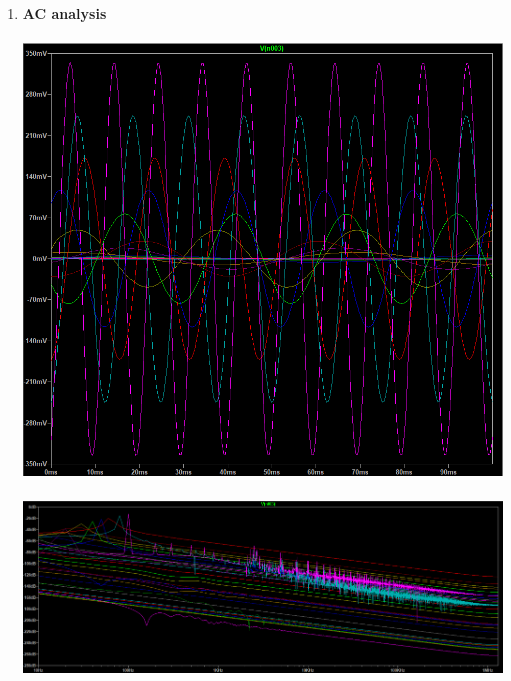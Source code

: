 \documentclass{article}
\begin{document}
\begin{enumerate}
			\item \textbf{AC analysis}\\\\
			\includegraphics[scale=0.65]{prelab 3 ex3.5 1}\\\\
			\includegraphics[scale=0.45]{prelab 3 ex3.5 2}\\\\\pagebreak
		\end{enumerate}
	
	
\end{document}
